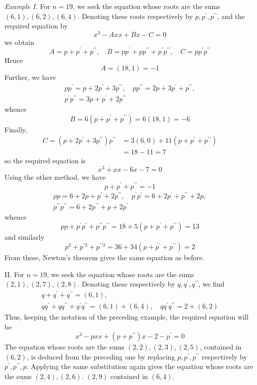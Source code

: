 \textit{Example I.} For \(n=19\), we seek the equation whose roots are the sums \((6,1),\allowbreak (6,2),\allowbreak (6,4)\). Denoting these roots respectively by \(p,\allowbreak p^{\prime},\allowbreak p^{\prime\prime}\), and the required equation by \[x^3-Axx+Bx-C=0\] we obtain \[A=p+p^{\prime}+p^{\prime\prime},\quad B=pp^{\prime}+pp^{\prime\prime}+p^{\prime}p^{\prime\prime},\quad C=pp^{\prime}p^{\prime\prime}\] Hence \[A=(18,1)=-1\] Further, we have
\[\begin{gathered}
pp^{\prime}=p+2p^{\prime}+3p^{\prime\prime},\quad pp^{\prime\prime}=2p+3p^{\prime}+p^{\prime\prime},\\
p^{\prime}p^{\prime\prime}=3p+p^{\prime}+2p^{\prime\prime}
\end{gathered}\] whence \[B=6(p+p^{\prime}+p^{\prime\prime})=6(18,1)=-6\] Finally, \[\begin{aligned}
C=(p+2p^{\prime}+3p^{\prime\prime})p^{\prime\prime}&=3(6,0)+11(p+p^{\prime}+p^{\prime\prime})\\
&=18-11=7
\end{aligned}\] so the required equation is \[x^3+xx-6x-7=0\] Using the other method, we have \[p+p^{\prime}+p^{\prime\prime}=-1\] \[\begin{gathered}
pp=6+2p+p^{\prime}+2p^{\prime\prime},\quad p^{\prime}p^{\prime}=6+2p^{\prime}+p^{\prime\prime}+2p,\\
p^{\prime\prime}p^{\prime\prime}=6+2p^{\prime\prime}+p+2p^{\prime}
\end{gathered}\] whence \[pp+p^{\prime}p^{\prime}+p^{\prime\prime}p^{\prime\prime}=18+5(p+p^{\prime}+p^{\prime\prime})=13\] and similarly \[p^3+p^{\prime3}+p^{\prime\prime3}=36+34(p+p^{\prime}+p^{\prime\prime})=2\] From these, Newton's theorem gives the same equation as before.

II. For \(n=19\), we seek the equation whose roots are the sums \((2,1),\allowbreak (2,7),\allowbreak (2,8)\). Denoting these respectively by \(q,\allowbreak q^{\prime},\allowbreak q^{\prime\prime}\), we find \[\begin{gathered}
q+q^{\prime}+q^{\prime\prime}=(6,1),\\
qq^{\prime}+qq^{\prime\prime}+q^{\prime}q^{\prime\prime}=(6,1)+(6,4),\quad qq^{\prime}q^{\prime\prime}=2+(6,2)
\end{gathered}\] Thus, keeping the notation of the preceding example, the required equation will be \[x^3-pxx+(p+p^{\prime\prime})x-2-p^{\prime}=0\] The equation whose roots are the sums \((2,2),\allowbreak (2,3),\allowbreak (2,5)\), contained in \((6,2)\), is deduced from the preceding one by replacing \(p,\allowbreak p^{\prime},\allowbreak p^{\prime\prime}\) respectively by \(p^{\prime},\allowbreak p^{\prime\prime},\allowbreak p\). Applying the same substitution again gives the equation whose roots are the sums \((2,4),\allowbreak (2,6)\). \((2,9)\) contained in \((6,4)\).

